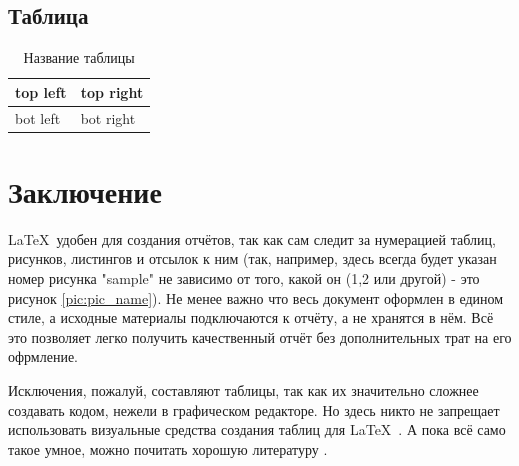 
\parindent=1cm

\subsection{Таблица}

\begin{table}[H]
	\caption{Название таблицы}
	\begin{center}
		\begin{tabular}{|l|l|}
			\hline
			top left & top right\\ \hline
			bot left & bot right\\ \hline
	\end{tabular}
		\label{tabular:tab_examp}
	\end{center}
\end{table}

\section*{Заключение}
\LaTeX\ удобен для создания отчётов, так как сам следит за нумерацией таблиц, рисунков, листингов и отсылок к ним (так, например, здесь всегда будет указан номер рисунка "sample" не зависимо от того, какой он (1,2 или другой) - это рисунок \ref{pic:pic_name}). Не менее важно что весь документ оформлен в едином стиле, а исходные материалы подключаются к отчёту, а не хранятся в нём. Всё это позволяет легко получить качественный отчёт без дополнительных трат на его офрмление.

Исключения, пожалуй, составляют таблицы, так как их значительно сложнее создавать кодом, нежели в графическом редакторе. Но здесь никто не запрещает использовать визуальные средства создания таблиц для \LaTeX\ . А пока всё само такое умное, можно почитать хорошую литературу \cite{saturday_is_monday}.


\renewcommand\refname{Список использованных источников}


